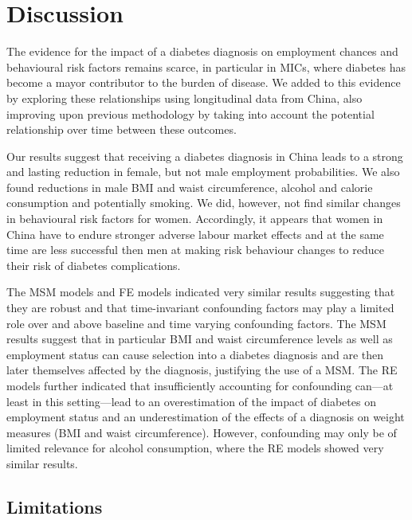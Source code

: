 \begin{landscape}
\begin{figure}
\begin{center}
\end{center}
\end{figure}
\end{landscape}



\section{\label{sec:Discussion5}Discussion}

The evidence for the impact of a diabetes diagnosis on employment chances and behavioural risk factors remains scarce, in particular in \acp{MIC}, where diabetes has become a mayor contributor to the burden of disease. We added to this evidence by exploring these relationships using longitudinal data from China, also improving upon previous methodology by taking into account the potential relationship over time between these outcomes.

Our results suggest that receiving a diabetes diagnosis in China leads to a strong and lasting reduction in female, but not male employment probabilities. We also found reductions in male \ac{BMI} and waist circumference, alcohol and calorie consumption and potentially smoking. We did, however, not find similar changes in behavioural risk factors for women. Accordingly, it appears that women in China have to endure stronger adverse labour market effects and at the same time are less successful then men at making risk behaviour changes to reduce their risk of diabetes complications.

The \ac{MSM} models and \ac{FE} models indicated very similar results suggesting that they are robust and that time-invariant confounding factors may play a limited role over and above baseline and time varying confounding factors. The \ac{MSM} results suggest that in particular \ac{BMI} and waist circumference levels as well as employment status can cause selection into a diabetes diagnosis and are then later themselves affected by the diagnosis, justifying the use of a \ac{MSM}. The \ac{RE} models further indicated that insufficiently accounting for confounding can---at least in this setting---lead to an overestimation of the impact of diabetes on employment status and an underestimation of the effects of a diagnosis on weight measures (\ac{BMI} and waist circumference). However, confounding may only be of limited relevance for  alcohol consumption, where the \ac{RE} models showed very similar results.

\subsection{Limitations}

